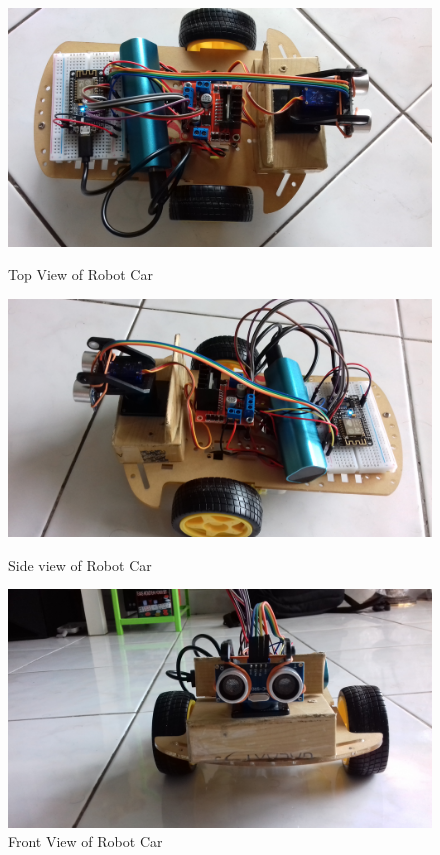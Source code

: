 \begin{figure}[htb]
	\includegraphics[width=1.0\columnwidth]{images/Top-view.jpg}
	\caption{Top View of Robot Car}\label{F:topview}

	\includegraphics[width=1.0\columnwidth]{images/Side-view2.jpg}
	\caption{Side view of Robot Car}\label{F:sideview}

	\includegraphics[width=1.0\columnwidth]{images/Front-view.jpg}
	\caption{Front View of Robot Car}\label{F:frontview}
\end{figure}


